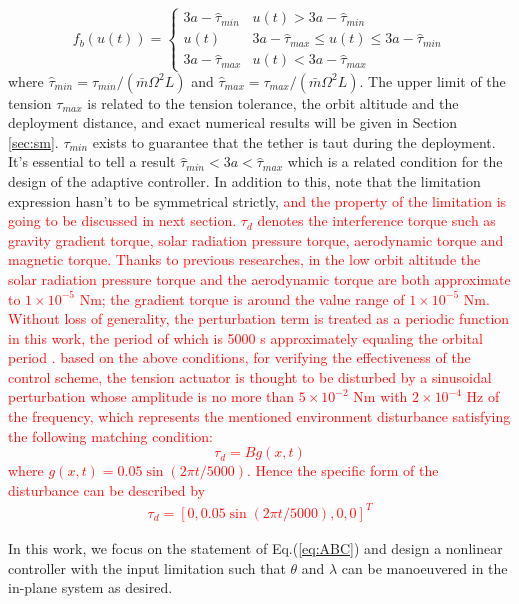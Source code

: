 \documentclass[3p]{elsarticle}
\theoremstyle{plain}
\begin{document}
\begin{equation}
f_b(u(t)) =\begin{cases}
3a-\hat{\tau}_{min}   & u(t) > 3a-\hat{\tau}_{min}\\
u(t)           & 3a - \hat{\tau}_{max} \le u(t) \le 3a-\hat{\tau}_{min}\\
3a-\hat{\tau}_{max}   & u(t) < 3a - \hat{\tau}_{max}
\end{cases}\label{eq:f_b}
\end{equation}
where $\hat{\tau}_{min} = \tau_{min}/(\bar{m}\Omega^2L)$ and $\hat{\tau}_{max} = \tau_{max}/(\bar{m}\Omega^2L)$. The upper limit of the tension $\tau_{max} $ is related to the tension tolerance, the orbit altitude and the deployment distance, and exact numerical results will be given in Section \ref{sec:sm}. $\tau_{min}$ exists to guarantee that the tether is taut during the deployment. It's essential to tell a result $\hat\tau_{min}<3a<\hat\tau_{max}$ which is a related condition for the design of the adaptive controller. In addition to this, note that the limitation expression hasn't to be symmetrical strictly, \textcolor{red}{and the property of the limitation is going to be discussed in next section.} \textcolor{red}{$\tau_d$ denotes the interference torque such as gravity gradient torque, solar radiation pressure torque, aerodynamic torque and magnetic torque. Thanks to previous researches, in the low orbit altitude the solar radiation pressure torque and the aerodynamic torque are both approximate to $1\times 10^{-5}$ Nm; the gradient torque is around the value range of $1\times 10^{-5}$ Nm. Without loss of generality, the perturbation term is treated as a periodic function in this work, the period of which is 5000 s approximately equaling the orbital period \cite{liu2013calculation,inamori2015magnetic}. based on the above conditions, for verifying the effectiveness of the control scheme, the tension actuator is thought to be disturbed by a sinusoidal perturbation whose amplitude is no more than $5\times 10^{-2}$ Nm with $2\times 10^{-4}$ Hz of the frequency, which represents the mentioned environment disturbance satisfying the following matching condition:
\begin{equation}
\tau_d=Bg(x,t)
\end{equation}
where $g(x,t) = 0.05\sin(2\pi t /5000)$. Hence the specific form of the disturbance can be described by
\begin{align}
\tau_d = [0,0.05\sin (2\pi t /5000),0,0]^T\label{eq:disturbance}
\end{align}}\par
In this work, we focus on the statement of Eq.(\ref{eq:ABC}) and design a nonlinear controller with the input limitation such that $\theta$ and $\lambda$ can be manoeuvered in the in-plane system as desired.
\end{document}
